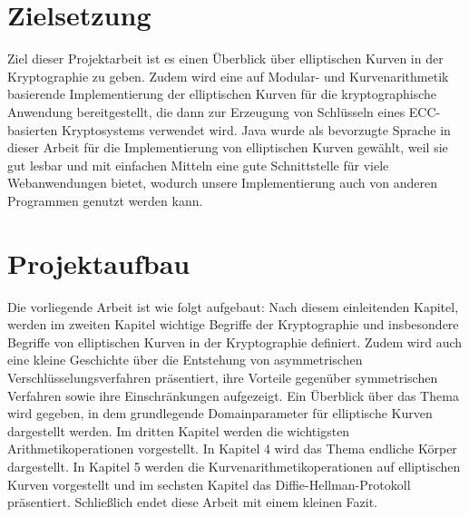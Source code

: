 \section{Zielsetzung}

Ziel dieser Projektarbeit ist es einen Überblick über elliptischen Kurven in der Kryptographie zu geben. 
Zudem wird eine auf Modular- und Kurvenarithmetik basierende Implementierung der elliptischen Kurven für die kryptographische Anwendung bereitgestellt, die dann zur  Erzeugung von Schlüsseln eines ECC-basierten Kryptosystems verwendet wird.
Java wurde als bevorzugte Sprache in dieser Arbeit für die Implementierung von elliptischen Kurven gewählt, weil sie gut lesbar und mit einfachen Mitteln eine gute Schnittstelle für viele Webanwendungen bietet, wodurch unsere Implementierung auch von anderen Programmen genutzt werden kann.

\section{Projektaufbau}


Die vorliegende Arbeit ist wie folgt aufgebaut: Nach diesem einleitenden Kapitel, werden im zweiten Kapitel wichtige Begriffe der Kryptographie und insbesondere Begriffe von elliptischen Kurven in der Kryptographie definiert. Zudem wird auch eine kleine Geschichte über die Entstehung von asymmetrischen Verschlüsselungsverfahren präsentiert, ihre Vorteile gegenüber symmetrischen Verfahren sowie ihre Einschränkungen aufgezeigt. Ein Überblick über das Thema wird gegeben, in dem grundlegende Domainparameter für elliptische Kurven dargestellt werden. Im dritten Kapitel werden die wichtigsten Arithmetikoperationen vorgestellt. In Kapitel 4 wird das Thema endliche Körper dargestellt. In Kapitel 5 werden die Kurvenarithmetikoperationen auf elliptischen Kurven vorgestellt und im sechsten Kapitel das Diffie-Hellman-Protokoll präsentiert. Schließlich endet diese Arbeit mit einem kleinen Fazit. 
